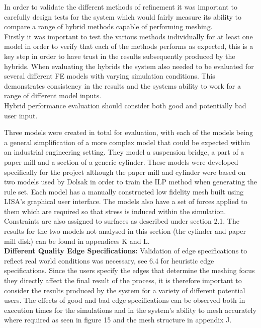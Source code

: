 
In order to validate the different methods of refinement it was important to carefully design tests for the system which would fairly measure its ability to compare a range of hybrid methods capable of performing meshing. \\ 

\noindent
Firstly it was important to test the various methods individually for at least one model in order to verify that each of the methods performs as expected, this is a key step in order to have trust in the results subsequently produced by the hybrids. When evaluating the hybrids the system also needed to be evaluated for several different FE models with varying simulation conditions. This demonstrates consistency in the results and the systems ability to work for a range of different model inputs. \\

\noindent
Hybrid performance evaluation should consider both good and potentially bad user input.  

\noindent
Three models were created in total for evaluation, with each of the models being a general simplification of a more complex model that could be expected within an industrial engineering setting. They model a suspension bridge, a part of a paper mill and a section of a generic cylinder. These models were developed specifically for the project although the paper mill and cylinder were based on two models used by Dolsak in order to train the ILP method when generating the rule set. Each model has a manually constructed low fidelity mesh built using LISA's graphical user interface. The models also have a set of forces applied to them which are required so that stress is induced within the simulation. Constraints are also assigned to surfaces as described under section 2.1. The results for the two models not analysed in this section (the cylinder and paper mill disk) can be found in appendices K and L. \\ 


\noindent
\textbf{Different Quality Edge Specifications: } Validation of edge specifications to reflect real world conditions was necessary, see 6.4 for heuristic edge specifications. Since the users specify the edges that determine the meshing focus they directly affect the final result of the process, it is therefore important to consider the results produced by the system for a variety of different potential users. The effects of good and bad edge specifications can be observed both in execution times for the simulations and in the system's ability to mesh accurately where required as seen in figure 15 and the mesh structure in appendix J. \\ 

